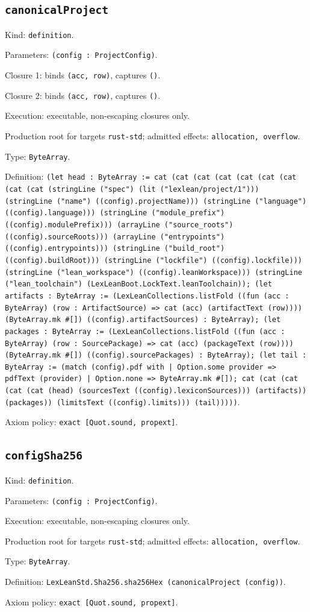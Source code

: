 \documentclass[11pt]{article}
\begin{document}
\subsection*{\texttt{canonicalProject}}
\noindent Kind: \texttt{definition}.\par
\noindent Parameters: \texttt{(config : ProjectConfig)}.\par
\noindent Closure 1: binds \texttt{(acc, row)}, captures \texttt{()}.\par
\noindent Closure 2: binds \texttt{(acc, row)}, captures \texttt{()}.\par
\noindent Execution: executable, non-escaping closures only.\par
\noindent Production root for targets \texttt{rust-std}; admitted effects: \texttt{allocation, overflow}.\par
\noindent Type: \texttt{ByteArray}.\par
\noindent Definition: \texttt{(let head : ByteArray := cat (cat (cat (cat (cat (cat (cat (cat (cat (stringLine ("spec") (lit ("lexlean/project/1"))) (stringLine ("name") ((config).projectName))) (stringLine ("language") ((config).language))) (stringLine ("module\_prefix") ((config).modulePrefix))) (arrayLine ("source\_roots") ((config).sourceRoots))) (arrayLine ("entrypoints") ((config).entrypoints))) (stringLine ("build\_root") ((config).buildRoot))) (stringLine ("lockfile") ((config).lockfile))) (stringLine ("lean\_workspace") ((config).leanWorkspace))) (stringLine ("lean\_toolchain") (LexLeanBoot.LockText.leanToolchain)); (let artifacts : ByteArray := (LexLeanCollections.listFold ((fun (acc : ByteArray) (row : ArtifactSource) => cat (acc) (artifactText (row)))) (ByteArray.mk \#[]) ((config).artifactSources) : ByteArray); (let packages : ByteArray := (LexLeanCollections.listFold ((fun (acc : ByteArray) (row : SourcePackage) => cat (acc) (packageText (row)))) (ByteArray.mk \#[]) ((config).sourcePackages) : ByteArray); (let tail : ByteArray := (match (config).pdf with | Option.some provider => pdfText (provider) | Option.none => ByteArray.mk \#[]); cat (cat (cat (cat (cat (head) (sourcesText ((config).lexiconSources))) (artifacts)) (packages)) (limitsText ((config).limits))) (tail)))))}.\par
\noindent Axiom policy: \texttt{exact [Quot.sound, propext]}.\par
\subsection*{\texttt{configSha256}}
\noindent Kind: \texttt{definition}.\par
\noindent Parameters: \texttt{(config : ProjectConfig)}.\par
\noindent Execution: executable, non-escaping closures only.\par
\noindent Production root for targets \texttt{rust-std}; admitted effects: \texttt{allocation, overflow}.\par
\noindent Type: \texttt{ByteArray}.\par
\noindent Definition: \texttt{LexLeanStd.Sha256.sha256Hex (canonicalProject (config))}.\par
\noindent Axiom policy: \texttt{exact [Quot.sound, propext]}.\par
\end{document}
